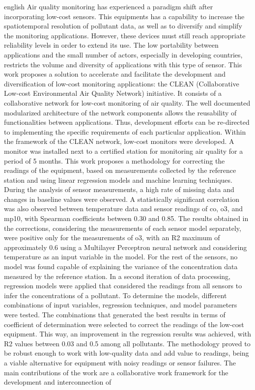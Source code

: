 \begin{resumo}[Abstract]
	\SingleSpacing
	\begin{otherlanguage*}{english}
		Air quality monitoring has experienced a paradigm shift after incorporating  low-cost sensors. This equipments has a capability to increase the spatiotemporal resolution of pollutant data, as well as to diversify and simplify the monitoring applications. However, these devices must still reach appropriate reliability levels in order to extend its use. The low portability between applications and the small number of actors, especially in developing countries, restricts the volume and diversity of applications with this type of sensor. This work proposes a solution to accelerate and facilitate the development and diversification of low-cost monitoring applications: the CLEAN (Collaborative Low-cost Environmental Air Quality Network) initiative. It consists of a collaborative network for low-cost monitoring of air quality. The well documented modularized architecture of the network components allows the reusability of functionalities between applications. Thus, development efforts can be re-directed to implementing the specific requirements of each particular application. Within the framework of the CLEAN network, low-cost monitors were developed. A monitor was installed next to a certified station for monitoring air quality for a period of 5 months. This work proposes a methodology for correcting the readings of the equipment, based on measurements collected by the reference station and using linear regression models and machine learning techniques. During the analysis of sensor measurements, a high rate of missing data and changes in baseline values were observed. A statistically significant correlation was also observed between temperature data and sensor readings of \acrshort{co}, \acrshort{o3}, and \acrshort{mp10}, with Spearman coefficients between 0.30 and 0.85. The results obtained in the corrections, considering the measurements of each sensor model separately, were positive only for the measurements of \acrshort{o3}, with an R2 maximum of approximately 0.6 using a Multilayer Perceptron neural network and considering temperature as an input variable in the model. For the rest of the sensors, no model was found capable of explaining the variance of the concentration data measured by the reference station. In a second iteration of data processing, regression models were applied that considered the readings from all sensors to infer the concentrations of a pollutant. To determine the models, different combinations of input variables, regression techniques, and model parameters were tested. The combinations that generated the best results in terms of coefficient of determination were selected to correct the readings of the low-cost equipment. This way, an improvement in the regression results was achieved, with R2 values between 0.03 and 0.5 among all pollutants. The methodology proved to be robust enough to work with low-quality data and add value to readings, being a viable alternative for equipment with noisy readings or sensor failures. The main contributions of the work are a collaborative work framework for the development and interconnection of 
\end{otherlanguage*}
\end{resumo}
